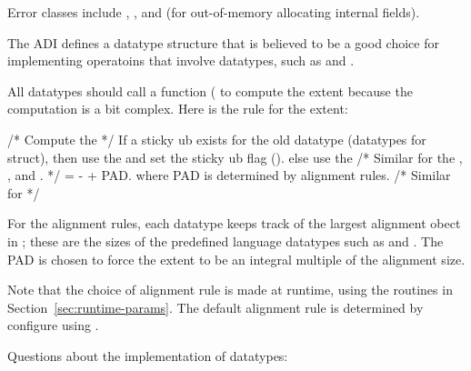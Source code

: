 \documentclass{article}
\begin{document}
Error classes include ,
, and  (for
out-of-memory allocating internal fields).

The ADI defines a datatype structure that is believed to be a good
choice for implementing operatoins that involve datatypes, such as
 and .

All datatypes should call a function
( to compute the extent because the
computation is a bit complex.  Here is the rule for the extent:
\begin{algorithm}
/* Compute the  */
If a sticky ub exists for the old datatype (datatypes for struct), then
    use the  and set the sticky ub flag
    ().
else
    use the 
/* Similar for the ,
   ,
      and
   . */
 =  -  + PAD.
where PAD is determined by alignment rules.  
/* Similar for  */

For the alignment rules, each datatype keeps track of the largest
alignment obect in ; these are the
sizes of the predefined language datatypes such as  and
.  The PAD is chosen to force the extent to be an integral
multiple of the alignment size.
\end{algorithm}
Note that the choice of alignment rule is made at runtime, using the
routines in Section~\ref{sec:runtime-params}.  The default alignment
rule is determined by configure using .

Questions about the implementation of datatypes:
\end{document}
